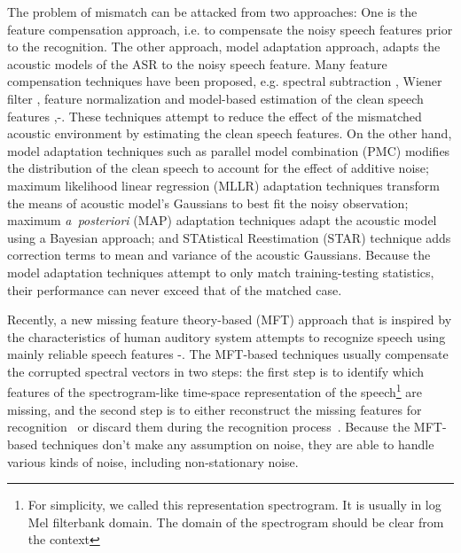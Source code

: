 The problem of mismatch can be attacked from two approaches: One is
the feature compensation approach, i.e. to compensate the noisy
speech features prior to the recognition. The other approach, model
adaptation approach, adapts the acoustic models of the ASR to the
noisy speech feature. Many feature compensation techniques have been
proposed, e.g. spectral subtraction \cite{JSLim79}, Wiener filter
\cite{JSLim79}, feature normalization \cite{MolauConf,MolauPHD} and
model-based estimation of the clean speech features
\cite{AceroPHD},\cite{Deng04Cep}-\cite{Deng05Var}. These techniques
attempt to reduce the effect of the mismatched acoustic environment
by estimating the clean speech features. On the other hand, model
adaptation techniques such as parallel model combination (PMC)
\cite{Gales93PMC,GalesPHD} modifies the distribution of the clean
speech to account for the effect of additive noise; maximum
likelihood linear regression (MLLR) adaptation
\cite{Leggetter95MLLR} techniques transform the means of acoustic
model's Gaussians to best fit the noisy observation; maximum
\emph{a~posteriori} (MAP) \cite{Lee94MAP,Huo95MAP} adaptation
techniques adapt the acoustic model using a Bayesian approach; and
STAtistical Reestimation (STAR) \cite{MorenoPHD} technique adds
correction terms to mean and variance of the acoustic Gaussians.
Because the model adaptation techniques attempt to only match
training-testing statistics, their performance can never exceed that
of the matched case.

Recently, a new missing feature theory-based (MFT) approach that is
inspired by the characteristics of human auditory system attempts to
recognize speech using mainly reliable speech features
\cite{Raj05}-\cite{Palomaki04Binaural}. The MFT-based techniques
usually compensate the corrupted spectral vectors in two steps: the
first step is to identify which features of the spectrogram-like
time-space representation of the speech\footnote{For simplicity, we
called this representation spectrogram. It is usually in log Mel
filterbank domain. The domain of the spectrogram should be clear
from the context} are missing, and the second step is to either
reconstruct the missing features for
recognition~\cite{Raj05,Raj04,Cooke2001,Hugo04} or discard them
during the recognition process~\cite{Cooke2001,Hugo04}. Because the
MFT-based techniques don't make any assumption on noise, they are
able to handle various kinds of noise, including non-stationary
noise.

